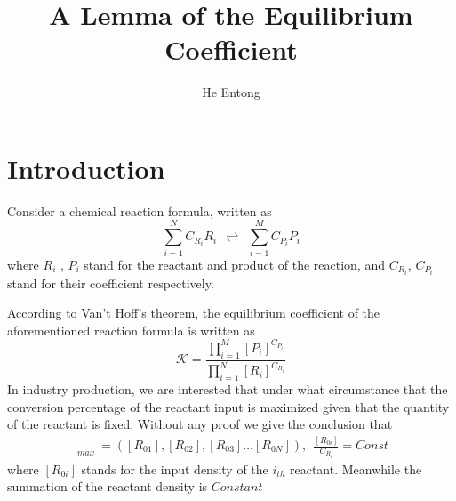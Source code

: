 \documentclass{article}
\title{\textbf{A Lemma of the Equilibrium Coefficient}}
\author{He Entong}
\date{}
\begin{document}
\maketitle

\section{Introduction}
Consider a chemical reaction formula, written as 
\begin{equation}
    \sum_{i=1}^{N} C_{R_i}R_i ~~ \rightleftharpoons ~~ \sum_{i=1}^{M} C_{P_i} P_i 
\end{equation}
where $R_i$ , $P_i$ stand for the reactant and product of the reaction, and $C_{R_i}$, $C_{P_i}$ stand for their coefficient respectively. \par
\indent According to Van't Hoff's theorem, the equilibrium coefficient of the aforementioned reaction formula is written as
\begin{equation}
    \mathscr{K} = \frac{\prod^{M}_{i=1}[P_i]^{C_{P_i}}}{\prod^{N}_{i=1}[R_i]^{C_{R_i}}}
\end{equation}
In industry production, we are interested that under what circumstance that the conversion percentage of the reactant input is maximized given that the quantity of the reactant is fixed. Without any proof we give the conclusion that
\begin{equation}
\begin{aligned}
    \mathop{\mathscr{K}_{R_{0i}}} \limits_{max} = ([R_{01}], [R_{02}], [R_{03}] \dots [R_{0N}]),~~ \frac{[R_{0i}]}{C_{R_i}} = Const
\end{aligned}
\end{equation}
where $[R_{0i}]$ stands for the input density of the $i_{th}$ reactant. Meanwhile the summation of the reactant density is  $Constant$
\end{document}
